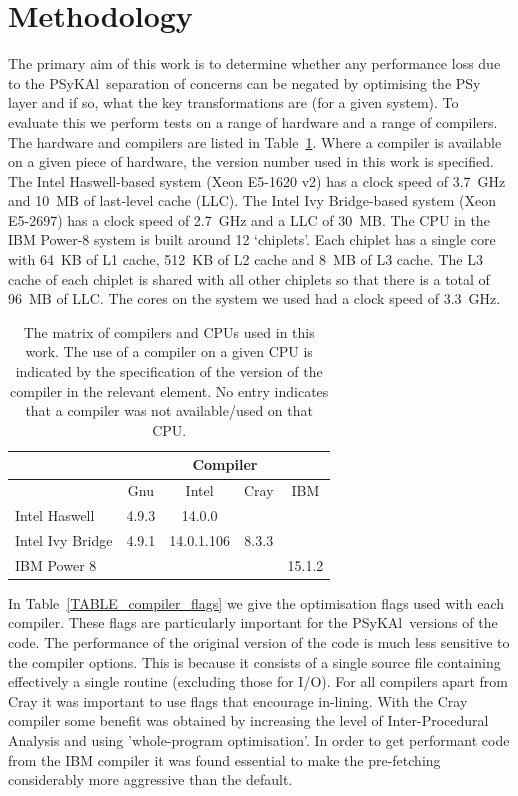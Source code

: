 \documentclass{IOS-Book-Article}
\newcommand{\psykal}{{PS}y{KA}l}
\begin{document}
\section{Methodology}

The primary aim of this work is to determine whether any performance
loss due to the \psykal\ separation of concerns can be negated by
optimising the PSy layer and if so, what the key transformations are
(for a given system). To evaluate this we perform tests on a range of
hardware and a range of compilers. The hardware and compilers are
listed in Table~\ref{TABLE_compilers}. Where a compiler is available
on a given piece of hardware, the version number used in this work is
specified.
%
The Intel Haswell-based system (Xeon E5-1620 v2) has a clock speed of
3.7~GHz and 10~MB of last-level cache (LLC). The Intel Ivy
Bridge-based system (Xeon E5-2697) has a clock speed of 2.7~GHz and a
LLC of 30~MB. The CPU in the IBM Power-8 system is built around 12
`chiplets'. Each chiplet has a single core with 64~KB of L1 cache,
512~KB of L2 cache and 8~MB of L3 cache. The L3 cache of each chiplet
is shared with all other chiplets so that there is a total of 96~MB of
LLC. The cores on the system we used had a clock speed of 3.3~GHz.

\begin{table}[!t]
\renewcommand{\arraystretch}{1.3}
\caption{The matrix of compilers and CPUs used in this work. The use
  of a compiler on a given CPU is indicated by the specification of
  the version of the compiler in the relevant element. No entry
  indicates that a compiler was not available/used on that CPU.}
\label{TABLE_compilers}
\centering
\begin{tabular}{|l|c|c|c|c|}
\hline
                 & \multicolumn{4}{c|}{Compiler}             \\
\hline
                 & Gnu   & Intel       & Cray    & IBM     \\
\hline
Intel Haswell    & 4.9.3 & 14.0.0      &         &          \\
Intel Ivy Bridge & 4.9.1 & 14.0.1.106  & 8.3.3   &          \\
IBM Power 8      &       &             &         & 15.1.2     \\
\hline
\end{tabular}
\end{table}

In Table~\ref{TABLE_compiler_flags} we give the optimisation flags
used with each compiler. These flags are particularly important for
the \psykal\ versions of the code. The performance of the original
version of the code is much less sensitive to the compiler
options. This is because it consists of a single source file
containing effectively a single routine (excluding those for I/O).
For all compilers apart from Cray it was important to use flags that
encourage in-lining. With the Cray compiler some benefit was obtained
by increasing the level of Inter-Procedural Analysis and using
'whole-program optimisation'. In order to get performant code from the
IBM compiler it was found essential to make the pre-fetching
considerably more aggressive than the default.
 
\end{document}
